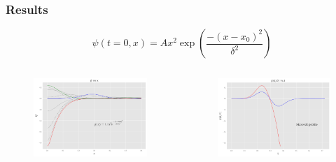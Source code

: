 \documentclass[hyperref={bookmarks=false},aspectratio=169]{beamer}
\begin{document}
\begin{frame}
  \frametitle{Results}

  \begin{equation*}
    \psi(t=0, x)=A x^{2} \exp \left(\frac{-\left(x-x_{0}\right)^{2}}{\delta^{2}}\right)
  \end{equation*}

  \begin{columns}
    \begin{figure}
      \centering
      \includegraphics[width=1\linewidth]{images/super_mod.pdf}
    \end{figure}
    \begin{figure}
      \centering
      \includegraphics[width=1\linewidth]{images/at0_mod.pdf}
    \end{figure}
  \end{columns}

\end{frame}
\end{document}
